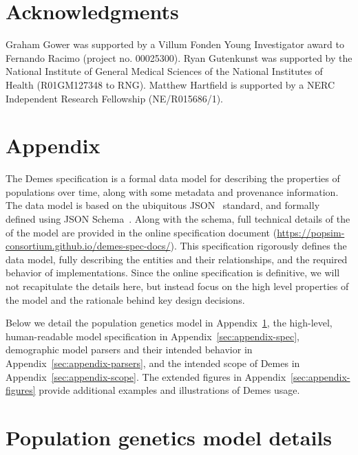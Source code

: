 \documentclass[11pt]{article}
\begin{document}
\section*{Acknowledgments}
Graham Gower was supported by a Villum Fonden Young Investigator award to Fernando Racimo (project no. 00025300).
Ryan Gutenkunst was supported by the National Institute of General Medical Sciences of the National Institutes of Health (R01GM127348 to RNG).
Matthew Hartfield is supported by a NERC Independent Research Fellowship (NE/R015686/1).




\renewcommand{\thefigure}{A\arabic{figure}}
\renewcommand{\thetable}{A\arabic{table}}
\renewcommand{\theequation}{A\arabic{equation}}
\renewcommand{\thesection}{A\arabic{section}}
\setcounter{figure}{0}
\setcounter{table}{0}
\setcounter{equation}{0}

\section*{Appendix}

The Demes specification is a formal data model for describing
the properties of populations over time,
along with some metadata and provenance information.
The data model is based on the ubiquitous JSON~\citep{bray2017javascript}
standard, and formally defined using
JSON Schema~\citep{wright2020json}.
Along with the schema, full technical details of the
of the model are provided in the
online specification document
(\url{https://popsim-consortium.github.io/demes-spec-docs/}).
This specification rigorously defines the data model,
fully describing the entities and their
relationships, and the required behavior of implementations.
Since the online specification is definitive,
we will not recapitulate the details
here, but instead focus on the high level properties of the model and
the rationale behind key design decisions.

Below we detail the population genetics model in
Appendix~\ref{sec:appendix-pop-gen-model},
the high-level, human-readable model specification in
Appendix~\ref{sec:appendix-spec}, demographic model parsers and their
intended behavior in Appendix~\ref{sec:appendix-parsers}, and the
intended scope of Demes in Appendix~\ref{sec:appendix-scope}.
The extended figures in Appendix~\ref{sec:appendix-figures} provide
additional examples and illustrations of Demes usage.

\section{Population genetics model details}
\label{sec:appendix-pop-gen-model}
\end{document}
